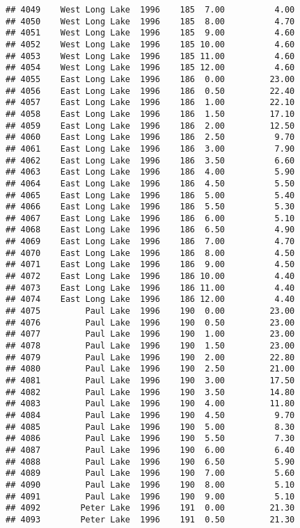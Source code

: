\documentclass[
]{article}
\begin{document}
\begin{verbatim}
## 4049    West Long Lake  1996    185  7.00          4.00
## 4050    West Long Lake  1996    185  8.00          4.70
## 4051    West Long Lake  1996    185  9.00          4.60
## 4052    West Long Lake  1996    185 10.00          4.60
## 4053    West Long Lake  1996    185 11.00          4.60
## 4054    West Long Lake  1996    185 12.00          4.60
## 4055    East Long Lake  1996    186  0.00         23.00
## 4056    East Long Lake  1996    186  0.50         22.40
## 4057    East Long Lake  1996    186  1.00         22.10
## 4058    East Long Lake  1996    186  1.50         17.10
## 4059    East Long Lake  1996    186  2.00         12.50
## 4060    East Long Lake  1996    186  2.50          9.70
## 4061    East Long Lake  1996    186  3.00          7.90
## 4062    East Long Lake  1996    186  3.50          6.60
## 4063    East Long Lake  1996    186  4.00          5.90
## 4064    East Long Lake  1996    186  4.50          5.50
## 4065    East Long Lake  1996    186  5.00          5.40
## 4066    East Long Lake  1996    186  5.50          5.30
## 4067    East Long Lake  1996    186  6.00          5.10
## 4068    East Long Lake  1996    186  6.50          4.90
## 4069    East Long Lake  1996    186  7.00          4.70
## 4070    East Long Lake  1996    186  8.00          4.50
## 4071    East Long Lake  1996    186  9.00          4.50
## 4072    East Long Lake  1996    186 10.00          4.40
## 4073    East Long Lake  1996    186 11.00          4.40
## 4074    East Long Lake  1996    186 12.00          4.40
## 4075         Paul Lake  1996    190  0.00         23.00
## 4076         Paul Lake  1996    190  0.50         23.00
## 4077         Paul Lake  1996    190  1.00         23.00
## 4078         Paul Lake  1996    190  1.50         23.00
## 4079         Paul Lake  1996    190  2.00         22.80
## 4080         Paul Lake  1996    190  2.50         21.00
## 4081         Paul Lake  1996    190  3.00         17.50
## 4082         Paul Lake  1996    190  3.50         14.80
## 4083         Paul Lake  1996    190  4.00         11.80
## 4084         Paul Lake  1996    190  4.50          9.70
## 4085         Paul Lake  1996    190  5.00          8.30
## 4086         Paul Lake  1996    190  5.50          7.30
## 4087         Paul Lake  1996    190  6.00          6.40
## 4088         Paul Lake  1996    190  6.50          5.90
## 4089         Paul Lake  1996    190  7.00          5.60
## 4090         Paul Lake  1996    190  8.00          5.10
## 4091         Paul Lake  1996    190  9.00          5.10
## 4092        Peter Lake  1996    191  0.00         21.30
## 4093        Peter Lake  1996    191  0.50         21.30

\end{verbatim}
\end{document}

